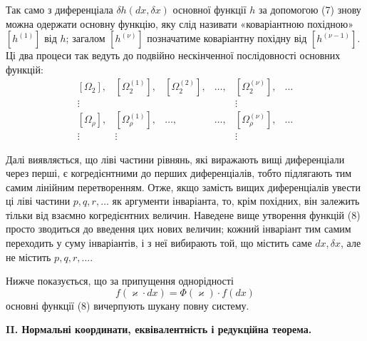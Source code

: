 \documentclass[11pt]{article}
\begin{document}
Так само з диференціала \(\delta h(dx,\delta x)\) основної функції \(h\) за допомогою (7) знову можна одержати основну функцію, яку слід називати «коваріантною похідною» \([h^{(1)}]\) від \(h\); загалом \([h^{(\nu)}]\) позначатиме коваріантну похідну від \([h^{(\nu-1)}]\). Ці два процеси так ведуть до подвійно нескінченної послідовності основних функцій:
\begin{equation}
\begin{array}{cccccc}
[\Omega_2], & [\Omega_2^{(1)}], & [\Omega_2^{(2)}], & \ldots,
& [\Omega_2^{(\nu)}], & \ldots\\
\vdots &&&& \vdots&\\
{}[\Omega_\rho], & [\Omega_\rho^{(1)}], & \ldots, & \ldots,
& [\Omega_\rho^{(\nu)}], & \ldots\\
\vdots & \vdots &&& \vdots&
\end{array}
\tag{8}
\end{equation}

Далі виявляється, що ліві частини рівнянь, які виражають вищі диференціали через перші, є когредієнтними до перших диференціалів, тобто підлягають тим самим лінійним перетворенням. Отже, якщо замість вищих диференціалів увести ці ліві частини \(p,q,r,\ldots\) як аргументи інваріанта, то, крім похідних, він залежить тільки від взаємно когредієнтних величин. Наведене вище утворення функцій (8) просто зводиться до введення цих нових величин; кожний інваріант тим самим переходить у суму інваріантів, і з неї вибирають той, що містить саме \(dx,\delta x\), але не містить \(p,q,r,\ldots\).

Нижче показується, що за припущення однорідності
\[
f(\varkappa\cdot dx)=\Phi(\varkappa)\cdot f(dx)
\]
основні функції (8) вичерпують шукану повну систему.

\begin{center}
\textbf{II. Нормальні координати, еквівалентність і редукційна теорема.}
\end{center}
\end{document}
